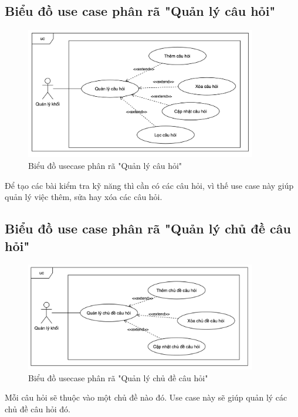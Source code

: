 \documentclass[../DoAn.tex]{subfiles}
\begin{document}
\subsection{Biểu đồ use case phân rã "Quản lý câu hỏi"}
\label{subsection:2.2.9}
\begin{figure}[H]
    \centering
    \includegraphics[width=0.9\textwidth]{Hinhve/UC_QuanLyCauHoi.png}
    \caption{Biểu đồ usecase phân rã "Quản lý câu hỏi"}
\end{figure}
Để tạo các bài kiểm tra kỹ năng thì cần có các câu hỏi, vì thế use case này giúp quản lý việc thêm, sửa hay xóa các câu hỏi.

\subsection{Biểu đồ use case phân rã "Quản lý chủ đề câu hỏi"}
\label{subsection:2.2.10}
\begin{figure}[H]
    \centering
    \includegraphics[width=0.9\textwidth]{Hinhve/UC_QuanLyChuDeCauHoi.png}
    \caption{Biểu đồ usecase phân rã "Quản lý chủ đề câu hỏi"}
\end{figure}
Mỗi câu hỏi sẽ thuộc vào một chủ đề nào đó. Use case này sẽ giúp quản lý các chủ đề câu hỏi đó.
\end{document}
